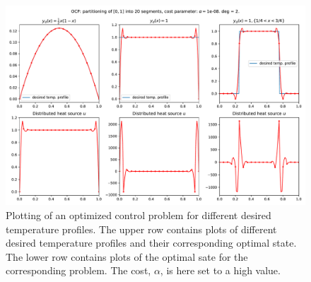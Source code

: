 \begin{figure}[!h]
  \centering
  \includegraphics[width=\textwidth]{Images/plots/task2_fig_2.pdf}
  \caption{Plotting of an optimized control problem for different desired temperature profiles. The upper row contains plots of different desired temperature profiles and their corresponding optimal state.
  The lower row contains plots of the optimal sate for the corresponding problem. The cost, $\alpha$, is here set to a high value.}
  \label{fig:2}
\end{figure}


